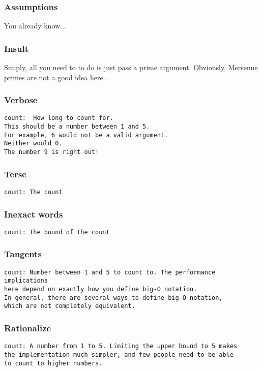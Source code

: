 \begin{frame}
\frametitle{Assumptions}

You already know...
\end{frame}

\begin{frame}
\frametitle{Insult}

Simply, all you need to to do is just pass a prime argument.
Obviously, Mersenne primes are not a good idea here...
\end{frame}

\begin{frame}[fragile]
\frametitle{Verbose}

\begin{lstlisting}
count:  How long to count for.
This should be a number between 1 and 5.
For example, 6 would not be a valid argument.
Neither would 0.
The number 9 is right out!
\end{lstlisting}
\end{frame}

\begin{frame}[fragile]
\frametitle{Terse}

\begin{lstlisting}
count: The count
\end{lstlisting}
\end{frame}

\begin{frame}
\frametitle{Inexact words}

\begin{lstlisting}
count: The bound of the count
\end{lstlisting}

\end{frame}

\begin{frame}
\frametitle{Tangents}

\begin{lstlisting}
count: Number between 1 and 5 to count to. The performance implications
here depend on exactly how you define big-O notation.
In general, there are several ways to define big-O notation,
which are not completely equivalent.
\end{lstlisting}

\end{frame}

\begin{frame}
\frametitle{Rationalize}
\begin{lstlisting}
count: A number from 1 to 5. Limiting the upper bound to 5 makes
the implementation much simpler, and few people need to be able
to count to higher numbers.
\end{lstlisting}

\end{frame}

